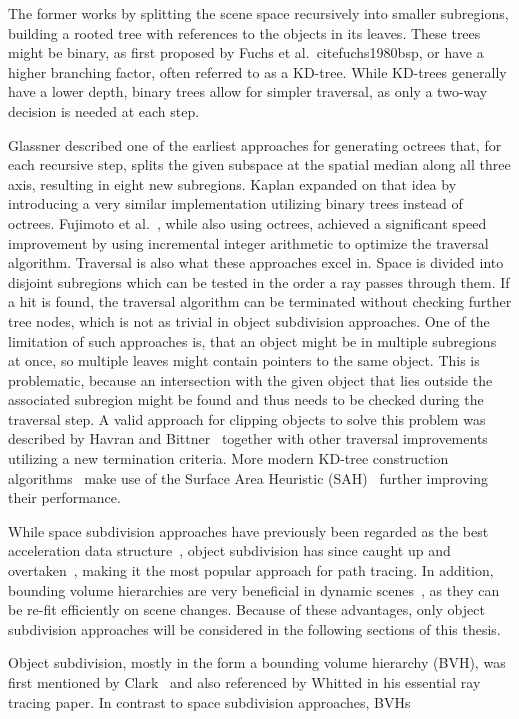 The former works by splitting the scene space recursively into smaller subregions, building a rooted tree with references to the objects in its leaves. These trees might be binary, as first proposed by Fuchs et al.~cite{fuchs1980bsp}, or have a higher branching factor, often referred to as a KD-tree. While KD-trees generally have a lower depth, binary trees allow for simpler traversal, as only a two-way decision is needed at each step. 

Glassner\cite{glassner_space_1984} described one of the earliest approaches for generating octrees that, for each recursive step, splits the given subspace at the spatial median along all three axis, resulting in eight new subregions. Kaplan\cite{kaplan_use_1985} expanded on that idea by introducing a very similar implementation utilizing binary trees instead of octrees. Fujimoto et al.~\cite{fujimoto_arts_1986}, while also using octrees, achieved a significant speed improvement by using incremental integer arithmetic to optimize the traversal algorithm. Traversal is also what these approaches excel in. Space is divided into disjoint subregions which can be tested in the order a ray passes through them. If a hit is found, the traversal algorithm can be terminated without checking further tree nodes, which is not as trivial in object subdivision approaches. One of the limitation of such approaches is, that an object might be in multiple subregions at once, so multiple leaves might contain pointers to the same object. This is problematic, because an intersection with the given object that lies outside the associated subregion might be found and thus needs to be checked during the traversal step. A valid approach for clipping objects to solve this problem was described by Havran and Bittner~\cite{Havran02onimproving} together with other traversal improvements utilizing a new termination criteria. More modern KD-tree construction algorithms~\cite{roccia2012kdtree,choi2010sahKdTree,wu2011sahKdTree} make use of the Surface Area Heuristic (SAH)~\cite{MacDonald2005HeuristicsFR} further improving their performance.

While space subdivision approaches have previously been regarded as the best acceleration data structure~\cite{havrand2000comparison}, object subdivision has since caught up and overtaken~\cite{vinkler2015comparison}, making it the most popular approach for path tracing. In addition, bounding volume hierarchies are very beneficial in dynamic scenes~\cite{wald_ray_2007}, as they can be re-fit efficiently on scene changes. Because of these advantages, only object subdivision approaches will be considered in the following sections of this thesis. 

Object subdivision, mostly in the form a bounding volume hierarchy (BVH), was first mentioned by Clark~\cite{clark1976bvh} and also referenced by Whitted\cite{whitted_improved_1980} in his essential ray tracing paper. In contrast to space subdivision approaches, BVHs 
